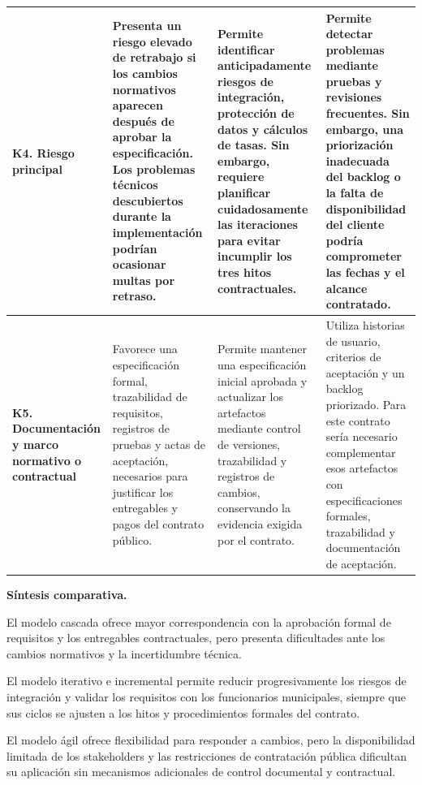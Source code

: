 \begin{longtable}{
|>{\raggedright\arraybackslash}p{}
|>{\raggedright\arraybackslash}p{}
|>{\raggedright\arraybackslash}p{}
|>{\raggedright\arraybackslash}p{}|}
\textbf{K4. Riesgo principal} &
Presenta un riesgo elevado de retrabajo si los cambios normativos aparecen después de aprobar la especificación. Los problemas técnicos descubiertos durante la implementación podrían ocasionar multas por retraso. &
Permite identificar anticipadamente riesgos de integración, protección de datos y cálculos de tasas. Sin embargo, requiere planificar cuidadosamente las iteraciones para evitar incumplir los tres hitos contractuales. &
Permite detectar problemas mediante pruebas y revisiones frecuentes. Sin embargo, una priorización inadecuada del backlog o la falta de disponibilidad del cliente podría comprometer las fechas y el alcance contratado. \\
\hline

\textbf{K5. Documentación y marco normativo o contractual} &
Favorece una especificación formal, trazabilidad de requisitos, registros de pruebas y actas de aceptación, necesarios para justificar los entregables y pagos del contrato público. &
Permite mantener una especificación inicial aprobada y actualizar los artefactos mediante control de versiones, trazabilidad y registros de cambios, conservando la evidencia exigida por el contrato. &
Utiliza historias de usuario, criterios de aceptación y un backlog priorizado. Para este contrato sería necesario complementar esos artefactos con especificaciones formales, trazabilidad y documentación de aceptación. \\
\hline

\end{longtable}

\normalsize

\noindent\textbf{Síntesis comparativa.}

El modelo cascada ofrece mayor correspondencia con la aprobación formal de requisitos y los entregables contractuales, pero presenta dificultades ante los cambios normativos y la incertidumbre técnica.

El modelo iterativo e incremental permite reducir progresivamente los riesgos de integración y validar los requisitos con los funcionarios municipales, siempre que sus ciclos se ajusten a los hitos y procedimientos formales del contrato.

El modelo ágil ofrece flexibilidad para responder a cambios, pero la disponibilidad limitada de los stakeholders y las restricciones de contratación pública dificultan su aplicación sin mecanismos adicionales de control documental y contractual.
